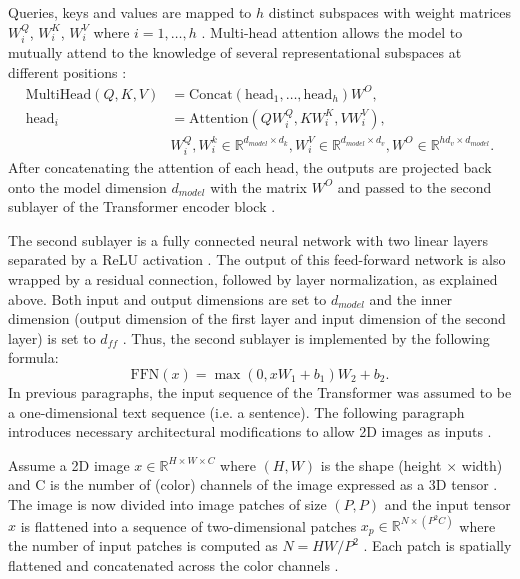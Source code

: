 Queries, keys and values are mapped to $h$ distinct subspaces with weight matrices $W_i^Q$, $W_i^K$, $W_i^V$ where $i=1,\dots,h$ \citep{Vaswani2017}.
Multi-head attention allows the model to mutually attend to the knowledge of several representational subspaces at different positions \citep{Vaswani2017}:
\begin{align}
	\text{MultiHead}(Q,K,V) &= \text{Concat}(\text{head}_1,\dots,\text{head}_h)W^O, \\
	\text{head}_i & = \text{Attention}(QW_i^Q,KW_i^K,VW_i^V), \\
	& W_{i}^{Q}, W_{i}^{k} \in \mathbb{R}^{d_{model}\times d_k} , W_i^V \in \mathbb{R}^{d_{model} \times d_v}, W^O \in \mathbb{R}^{hd_v \times d_{model}}.	
\end{align}
After concatenating the attention of each head, the outputs are projected back onto the model dimension $d_{model}$ with the matrix $W^O$ and passed to the second sublayer of the Transformer encoder block \citep{Vaswani2017}.
\par
The second sublayer is a fully connected neural network with two linear layers separated by a ReLU activation \citep{Vaswani2017}.
The output of this feed-forward network is also wrapped by a residual connection, followed by layer normalization, as explained above.
Both input and output dimensions are set to $d_{model}$ and the inner dimension (output dimension of the first layer and input dimension of the second layer) is set to $d_{ff}$ \citep{Vaswani2017}.
Thus, the second sublayer is implemented by the following formula:
\begin{equation}
	\text{FFN}(x) = \max(0, xW_1 + b_1)W_2+b_2. 
	\label{equation:FFN}
\end{equation}
In previous paragraphs, the input sequence of the Transformer was assumed to be a one-dimensional text sequence (i.e. a sentence).
The following paragraph introduces necessary architectural modifications to allow 2D images as inputs \citep{Dosovitskiy2020}.
\par
Assume a 2D image $x\in \mathbb{R}^{H\times W \times C }$ where $(H, W)$ is the shape (height $\times$ width) and C is the number of (color) channels of the image expressed as a 3D tensor \citep{Dosovitskiy2020}.
The image is now divided into image patches of size $(P, P)$ and the input tensor $x$ is flattened into a sequence of two-dimensional patches $x_p \in \mathbb{R}^{N \times (P^2C)}$ where the number of input patches is computed as $N = HW/P^2$ \citep{Dosovitskiy2020}.
Each patch is spatially flattened and concatenated across the color channels \citep{Dosovitskiy2020}.
